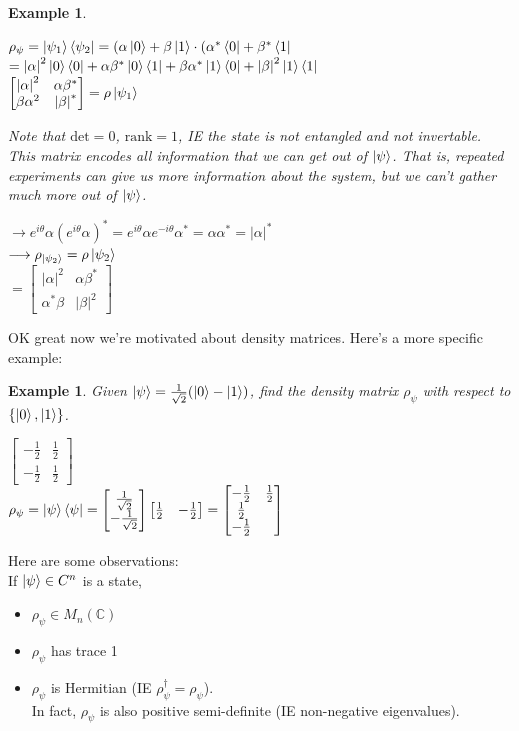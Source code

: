 \documentclass[12pt]{article}
\theoremstyle{plain}
\theoremstyle{nonumberplain}
\theoremstyle{plain}
\newtheorem{example}[lemma]{Example}
\theoremstyle{nonumberplain}
\newcommand\1{{\bf 1}}
\newcommand{\bmat}[1]{\begin{bmatrix*} #1 \end{bmatrix*}} %
\newcommand{\C}{\mathbb{C}} %
\newcommand{\<}{\left\langle}
\renewcommand{\>}{\right\rangle}
\newcommand{\lb}{\left\{}
\newcommand{\rb}{\right\}}
\newcommand{\abs}[1]{\left\lvert #1 \right\rvert} %
\begin{document}
\begin{example}
\begin{center}
$\rho_\psi=\ket{\psi_1}\bra{\psi_2}=(\alpha\ket{0}+\beta\ket{1}\cdot(\alpha^*\bra{0}+\beta^*\bra{1}$\\
$=\abs{\alpha}^2\ket{0}\bra{0}+\alpha\beta^*\ket{0}\bra{1}+\beta\alpha^*\ket{1}\bra{0}+\abs{\beta}^2\ket{1}\bra{1}$\\
$\bmat{\abs{\alpha}^2 & \alpha\beta^* \\ \beta\alpha^2 & \abs{\beta}^*} =\rho\ket{\psi_1}$
\end{center}
Note that $\text{det}=0$, $\text{rank}=1$, IE the state is not entangled and not invertable. This matrix encodes all information that we can get out of $\ket{\psi}$. That is, repeated experiments can give us more information about the system, but we can't gather much more out of $\ket{\psi}$.
\begin{center}
$\longrightarrow e^{i\theta}\alpha(e^{i\theta}\alpha)^*=e^{i\theta}\alpha e^{-i\theta}\alpha^*=\alpha\alpha^*=\abs{\alpha}^*$\\
$\longrightarrow \rho_{\ket{\psi_2}}=\rho\ket{\psi_2}$ \\
$=\bmat{\abs{\alpha}^2 & \alpha\beta^* \\ \alpha^*\beta & \abs{\beta}^2}$
\end{center}
\end{example}
OK great now we're motivated about density matrices. Here's a more specific example:
\begin{example}
Given $\ket{\psi}=\frac{1}{\sqrt{2}}(\ket{0}-\ket{1})$, find the density matrix $\rho_\psi$ with respect to $\lb\ket{0},\ket{1}\rb$.
\begin{center}
$\bmat{-\frac{1}{2} & \frac{1}{2} \\ -\frac{1}{2} & \frac{1}{2}}$ \\
$\rho_\psi=\ket{\psi}\bra{\psi}=\bmat{\frac{1}{\sqrt{2}} \\ -\frac{1}{\sqrt{2}}}\bmat{\frac{1}{2} & -\frac{1}{2}}=\bmat{-\frac{1}{2} & \frac{1}{2} \\ \frac{1}{2} \\ -\frac{1}{2}}$
\end{center}
\end{example}
Here are some observations: \\
If  $\ket{\psi}\in C^n$ is a state,
\begin{itemize}
\item $\rho_\psi\in M_n(\C)$
\item $\rho_\psi$ has trace 1
\item $\rho_\psi$ is Hermitian (IE $\rho_\psi^\dagger=\rho_\psi$). \\ In fact, $\rho_\psi$ is also positive semi-definite (IE non-negative eigenvalues).
\end{itemize}
\end{document}
